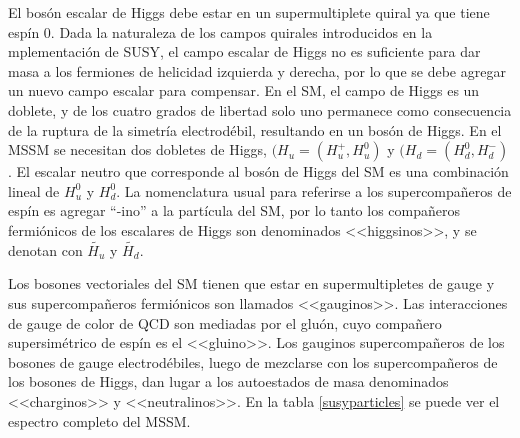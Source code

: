 El bosón escalar de Higgs debe estar en un supermultiplete quiral ya que tiene espín 0. Dada la naturaleza de los campos quirales introducidos en la  mplementación de SUSY, el campo escalar de Higgs no es suficiente para dar masa a los fermiones de helicidad izquierda y derecha, por lo que se debe agregar un nuevo campo escalar para compensar. En el SM, el campo de Higgs es un doblete, y de los cuatro grados de libertad solo uno permanece como consecuencia de la ruptura de la simetría electrodébil, resultando en un bosón de Higgs. En el MSSM se necesitan dos dobletes de Higgs, $(H_{u}=(H^{+}_{u},H^{0}_{u})$
y $(H_{d}=(H^{0}_{d},H^{-}_{d})$. El escalar neutro que corresponde al bosón de Higgs del SM es una combinación lineal de $H^{0}_{u}$ y $H^{0}_{d}$. La nomenclatura usual para referirse a los supercompañeros de espín  es agregar “-ino” a la partícula del SM, por lo tanto los compañeros fermiónicos de los escalares de Higgs son denominados <<higgsinos>>, y se denotan con $\widetilde{H_{u}}$ y $\widetilde{H_{d}}$.

Los bosones vectoriales del SM tienen que estar en supermultipletes de gauge y sus supercompañeros fermiónicos son llamados <<gauginos>>. Las interacciones de gauge de color de QCD son mediadas por el gluón, cuyo compañero supersimétrico de espín  es el <<gluino>>. Los gauginos supercompañeros de los bosones de gauge electrodébiles, luego de mezclarse con los supercompañeros de los bosones de Higgs, dan lugar a los autoestados de masa denominados <<charginos>> y <<neutralinos>>. En la tabla \ref{susyparticles} se puede ver el espectro completo del MSSM.


